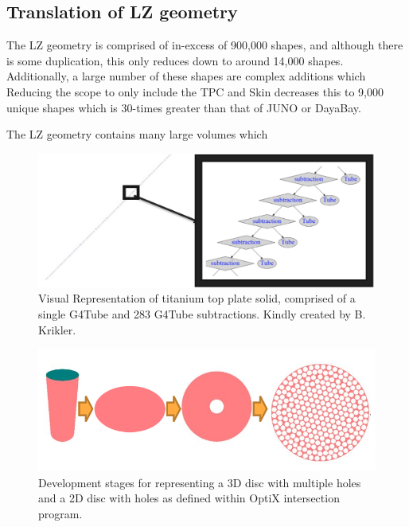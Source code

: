 \subsection{Translation of LZ geometry}
\par
The LZ geometry is comprised of in-excess of 900,000 shapes, and although there is some duplication, this only reduces down to around 14,000 shapes.
Additionally, a large number of these shapes are complex additions which 
Reducing the scope to only include the TPC and Skin decreases this to 9,000 unique shapes which is 30-times greater than that of JUNO or DayaBay.


\par
The LZ geometry contains many large volumes which


\begin{figure}[!htbp]
\includegraphics[width=\textwidth]{Figures/Simulations/unbalanced_ptfe.png}
\centering
\caption{Visual Representation of titanium top plate solid, comprised of a single G4Tube and 283 G4Tube subtractions. Kindly created by B. Krikler.}
\label{fig:Opticks_unbalanced_shape}
\end{figure}



\begin{figure}[!htbp]
\includegraphics[width=\textwidth]{Figures/Simulations/opticks_PTFE_primative.png}
\centering
\caption{Development stages for representing a 3D disc with multiple holes and a 2D disc with holes as defined within OptiX intersection program.}
\label{fig:Opticks_PTFE_primative}
\end{figure}


